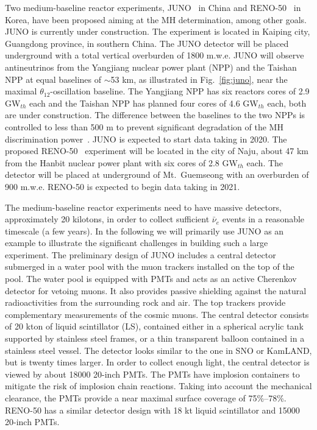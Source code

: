 \documentclass[aps,twocolumn,preprintnumbers,amsmath,superscriptaddress,amssymb,floats,nofootinbib]{revtex4-1}
\begin{document}
Two medium-baseline reactor experiments, JUNO~\cite{He-Now2014} in China and RENO-50~\cite{RENO-50} in Korea, have been proposed aiming at the MH determination, among other goals. JUNO is currently under construction.
The experiment is located in Kaiping city, Guangdong province, in southern China.
The JUNO detector will be placed underground with a total vertical overburden of 1800 m.w.e. JUNO will observe antineutrinos from the Yangjiang nuclear power plant (NPP) and the Taishan NPP at equal baselines of $\sim$53 km, as illustrated in Fig.~\ref{fig:juno}, near the maximal $\theta_{12}$-oscillation baseline. The Yangjiang NPP has six reactors cores of 2.9 GW$_{th}$ each and the Taishan NPP has planned four cores of 4.6 GW$_{th}$ each, both are under construction. The difference between the baselines to the two NPPs is controlled to less than 500 m to prevent significant degradation of the MH discrimination power~\cite{Li-PRD13}. JUNO is expected to start data taking in 2020. The proposed RENO-50~\cite{RENO-50} experiment will be located in the city of Naju, about 47 km from the Hanbit nuclear power plant with six cores of 2.8 GW$_{th}$ each. The detector will be placed at underground of Mt.~Guemseong with an overburden of 900 m.w.e. RENO-50 is expected to begin data taking in 2021. 

The medium-baseline reactor experiments need to have massive detectors, approximately 20 kilotons, in order to collect sufficient $\bar\nu_e$ events in a reasonable timescale (a few years).
In the following we will primarily use JUNO as an example to illustrate the significant challenges in building such a large experiment. 
The preliminary design of JUNO includes a central detector submerged in a water pool with the muon trackers installed on the top of the pool. 
The water pool is equipped with PMTs and acts as an active Cherenkov detector for vetoing muons.
It also provides passive shielding against the natural radioactivities from the surrounding rock and air. 
The top trackers provide complementary measurements of the cosmic muons. 
The central detector consists of 20 kton of liquid scintillator (LS), contained either in a spherical acrylic tank supported by stainless steel frames, or a thin transparent balloon contained in a stainless steel vessel. 
The detector looks similar to the one in SNO or KamLAND, but is twenty times larger. 
In order to collect enough light, the central detector is viewed by about 18000 20-inch PMTs.
The PMTs have implosion containers to mitigate the risk of implosion chain reactions. Taking into account the mechanical clearance, the PMTs provide a near maximal surface coverage of 75\%--78\%. RENO-50 has a similar detector design with 18 kt liquid scintillator and 15000 20-inch PMTs.
 
\end{document}
